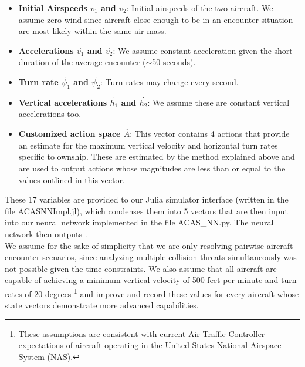 \documentclass[journal, a4paper]{IEEEtran}
\begin{document}
\begin{itemize}
   \item \textbf{Initial Airspeeds $v_1$ and $v_2$}: Initial airspeeds of the two aircraft. We assume zero wind since aircraft close enough to be in an encounter situation are most likely within the same air mass.
   \item \textbf{Accelerations $\overset{\cdot}{v_1}$ and $\overset{\cdot}{v_2}$}: We assume constant acceleration given the short duration of the average encounter ($\sim$50 seconds).
   \item \textbf{Turn rate $\overset{\cdot}{\psi_1}$ and $\overset{\cdot}{\psi_2}$}: Turn rates may change every second.
   \item \textbf{Vertical accelerations $\overset{\cdot}{h_1}$ and $\overset{\cdot}{h_2}$}: We assume these are constant vertical accelerations too.
   \item \textbf{Customized action space $\overset{\circ}{A}$}: This vector contains 4 actions that provide an estimate for the maximum vertical velocity and horizontal turn rates specific to ownship. These are estimated by the method explained above and are used to output actions whose magnitudes are less than or equal to the values outlined in this vector.
   \end{itemize}
These 17 variables are provided to our Julia simulator interface (written in the file ACASNNImpl.jl), which condenses them into 5 vectors that are then input into our neural network implemented in the file ACAS\_NN.py. The neural network then outputs \cite{code}. 
\\We assume for the sake of simplicity that we are only resolving pairwise aircraft encounter scenarios, since analyzing multiple collision threats simultaneously was not possible given the time constraints. We also assume that all aircraft are capable of achieving a minimum vertical velocity of 500 feet per minute and turn rates of 20 degrees \footnote{These assumptions are consistent with current Air Traffic Controller expectations of aircraft operating in the United States National Airspace System (NAS).} and improve and record these values for every aircraft whose state vectors demonstrate more advanced capabilities. 
   
\end{document}
